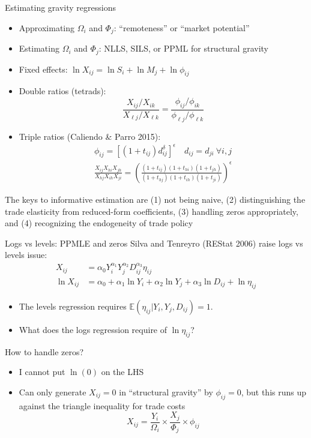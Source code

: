\documentclass[10pt,notes=hide]{beamer}
\begin{document}
\begin{frame}{Estimating gravity regressions}
\begin{itemize}
	\item Approximating $\Omega_i$ and $\Phi_j$: ``remoteness'' or ``market potential''
	\item Estimating $\Omega_i$ and $\Phi_j$: NLLS, SILS, or PPML for structural gravity
	\item Fixed effects:
	$\ln X_{ij} = \ln S_i + \ln M_j + \ln \phi_{ij}$
	\item Double ratios (tetrads):
	\begin{equation*}
	\frac{X_{ij}/X_{ik}}{X_{\ell j}/X_{\ell k}} = \frac{\phi_{ij}/\phi_{ik}}{\phi_{\ell j}/\phi_{\ell k}} 
	\end{equation*}
	\item Triple ratios (Caliendo \& Parro 2015):
	\begin{align*}
	\phi_{ij} = [(1+t_{ij})d_{ij}^\delta]^{\epsilon} \quad d_{ij}=d_{ji} \ \forall  i,j \\
	\frac{X_{ij}X_{hi}X_{jh}}{X_{hj}X_{ih}X_{ji}}
	=
	\left(
	\frac{(1+t_{ij})(1+t_{hi})(1+t_{jh})}{(1+t_{hj})(1+t_{ih})(1+t_{ji})} 
	\right)^{\epsilon}
	\end{align*}
\end{itemize}
The keys to informative estimation are (1) not being naive, (2) distinguishing the trade elasticity from reduced-form coefficients, (3) handling zeros appropriately, and (4) recognizing the endogeneity of trade policy
\end{frame}
\begin{frame}{Logs vs levels: PPMLE and zeros}
Silva and Tenreyro (REStat 2006) raise logs vs levels issue:
\begin{align*}
X_{ij} &= \alpha_0 Y_i^{\alpha_1}  Y_j^{\alpha_2}  D_{ij}^{\alpha_3} \eta_{ij}
\\
\ln X_{ij} &= \alpha_0 +{\alpha_1} \ln  Y_i   +{\alpha_2}\ln  Y_j +{\alpha_3} \ln D_{ij} + \ln \eta_{ij}
\end{align*}
\vspace{-8mm}
\begin{itemize}
	\item The levels regression requires $\mathbb{E}\left(\eta_{ij}|Y_i,Y_j,D_{ij}\right)=1$.
	\item What does the logs regression require of $\ln \eta_{ij}$?
\end{itemize}
How to handle zeros?
\begin{itemize}
	\item I cannot put $\ln(0)$ on the LHS
	\item Can only generate $X_{ij}=0$ in ``structural gravity'' by $\phi_{ij} = 0$, but this runs up against the triangle inequality for trade costs
\begin{equation*}
X_{ij} = {\frac{Y_i}{\Omega_i}} \times {\frac{X_j}{\Phi_j}} \times \phi_{ij}
\end{equation*}
\end{itemize}
\end{frame}
\end{document}
